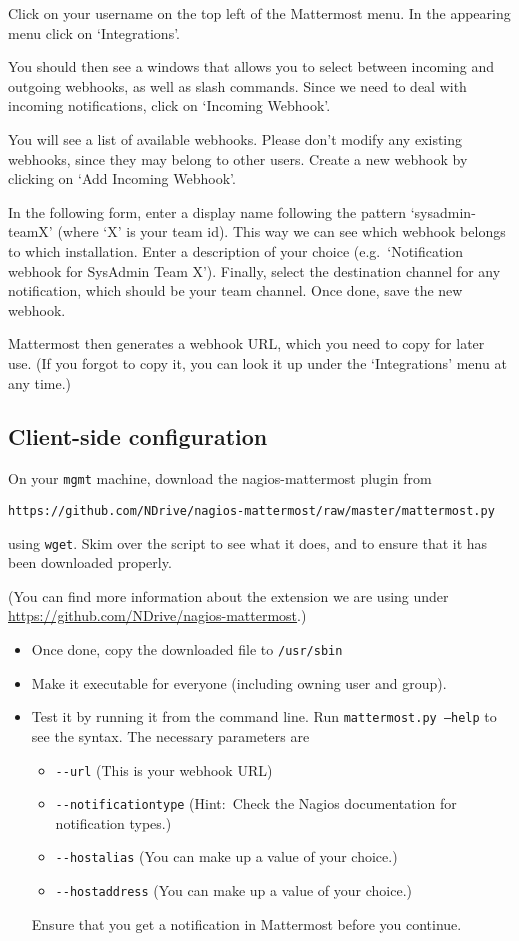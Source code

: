 \documentclass{article}   	%
\begin{document}
Click on your username on the top left of the Mattermost menu. In the appearing menu click on `Integrations'.

You should then see a windows that allows you to select between incoming and outgoing webhooks, as well as slash commands. Since we need to deal with incoming notifications, click on `Incoming Webhook'.

You will see a list of available webhooks. Please don't modify any existing webhooks, since they may belong to other users. Create a new webhook by clicking on `Add Incoming Webhook'. 

In the following form, enter a display name following the pattern `sysadmin-teamX' (where `X' is your team id). This way we can see which webhook belongs to which installation. Enter a description of your choice (e.g.~`Notification webhook for SysAdmin Team X'). Finally, select the destination channel for any notification, which should be your team channel. Once done, save the new webhook. 

Mattermost then generates a webhook URL, which you need to copy for later use. (If you forgot to copy it, you can look it up under the `Integrations' menu at any time.)

\newpage

\subsection{Client-side configuration}

On your {\tt mgmt} machine, download the nagios-mattermost plugin from 

{\tt https://github.com/NDrive/nagios-mattermost/raw/master/mattermost.py} 

using {\tt wget}. Skim over the script to see what it does, and to ensure that it has been downloaded properly.

(You can find more information about the extension we are using under \url{https://github.com/NDrive/nagios-mattermost}.)

\begin{itemize}
\item Once done, copy the downloaded file to {\tt /usr/sbin}
\item Make it executable for everyone (including owning user and group).
\item Test it by running it from the command line. Run {\tt mattermost.py --help} to see the syntax. The necessary parameters are 

\begin{itemize}
\item {\tt -{}-url} (This is your webhook URL)
\item {\tt -{}-notificationtype} (Hint:~Check the Nagios documentation for notification types.)
\item {\tt -{}-hostalias} (You can make up a value of your choice.)
\item {\tt -{}-hostaddress} (You can make up a value of your choice.)
\end{itemize}

Ensure that you get a notification in Mattermost before you continue.
\end{itemize}
\end{document}
